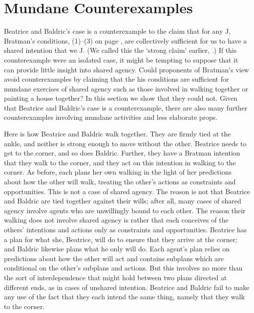 \documentclass[12pt,\papersize]{extarticle}
\begin{document}
\section{Mundane Counterexamples}
Beatrice and Baldric's case is a counterexample to the claim that for any J, Bratman's conditions, (1)--(3) on page \pageref{quote:bratman_account}, are collectively sufficient for us to have a shared intention that we J.
(We called this the `strong claim' earlier, .)
If this counterexample were an isolated case, it might be tempting to suppose that it can provide little insight into shared agency.
Could proponents of Bratman's view avoid counterexamples by claiming that the his conditions are sufficient for mundane exercises of shared agency such as those involved in walking together or painting a house together?
In this section we show that they could not.
Given that Beatrice and Baldric's case is a counterexample,
there are also many further counterexamples involving mundane activities and less elaborate props.

Here is how Beatrice and Baldric walk together.
They are firmly tied at the ankle, and neither is strong enough to move without the other.
Beatrice needs to get to the corner, and so does Baldric.
Further, they have a Bratman intention that they walk to the corner, and they act on this intention in walking to the corner.
As before, each plans her own walking in the light of her predictions about how the other will walk, treating the other's actions as constraints and opportunities.
This is not a case of shared agency.
The reason is not that Beatrice and Baldric are tied together against their wills; 
after all, many cases of shared agency involve agents who are unwillingly bound to each other.
The reason their walking does not involve shared agency 
is rather that each conceives of the others' intentions and actions only as constraints and opportunities.
Beatrice has a plan for what she, Beatrice, will do to ensure that they arrive at the corner; and Baldric likewise plans what he only will do.
Each agent's plan relies on predictions about how the other will act and contains subplans which are conditional on the other's subplans and actions.
But this involves no more than the sort of interdependence that might hold between two plans directed at different ends, as in cases of unshared intention.
Beatrice and Baldric fail to make any use of the fact that they each intend the same thing, namely that they walk to the corner.
\end{document}
